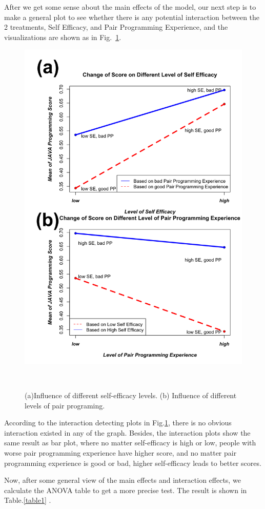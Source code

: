 \documentclass{sigchi}
\begin{document}
After we get some sense about the main effects of the model, our next step is to make a general plot to see whether there is any potential interaction between the 2 treatments, Self Efficacy, and Pair Programming Experience, and the visualizations are shown as in Fig.~\ref{fig:figure4}.

\begin{figure}
\centering
  \includegraphics[width=0.8\columnwidth]{figures/fig4}
  \caption{(a)Influence of different self-efficacy levels. (b) Influence of different levels of pair programing.}~\label{fig:figure4}
\end{figure}

According to the interaction detecting plots in Fig.\ref{fig:figure4}, there is no obvious interaction existed in any of the graph. Besides, the interaction plots show the same result as bar plot, where no matter self-efficacy is high or low, people with worse pair programming experience have higher score, and no matter pair programming experience is good or bad, higher self-efficacy leads to better scores.

Now, after some general view of the main effects and interaction effects, we calculate the ANOVA table to get a more precise test. The result is shown in Table.\ref{table1} .
\end{document}
